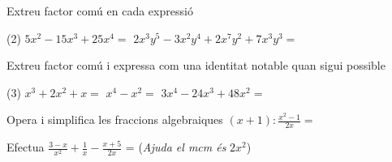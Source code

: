 \begin{autoaval}{49}
\begin{mylist}
\exer[2]  Extreu factor comú en cada expressió
\begin{tasks}(2)
   \task $5x^{2} -15x^{3} +25x^{4} =$  
	\task  $2x^{3} y^{5} -3x^{2} y^{4} +2x^{7} y^{2} +7x^{3} y^{3} =$
\end{tasks}

\exer[2]  Extreu factor comú i expressa com una identitat notable quan sigui possible
\begin{tasks}(3)
	\task $x^{3} +2x^{2} +x=$   
	\task  $x^{4} -x^{2} =$   
	\task  $3x^{4} -24x^{3} +48x^{2} =$
\end{tasks}
\answers[cols=2]{[$x (x+1)^2$, $x^2 (x+1)(x-1)$, $3x^2 (x^2-8x+16)$]}

\exer[2]  Opera i simplifica les fraccions algebraiques $(x+1):\frac{x^{2} -1}{2x} =$

\exer[2]  Efectua $\frac{3-x}{x^{2} } +\frac{1}{x} -\frac{x+5}{2x} $ =  \quad (\textit{Ajuda el mcm és} $2x^{2} $)

\end{mylist}

\end{autoaval}




\newpage
\setcounter{myenumi}{0}


